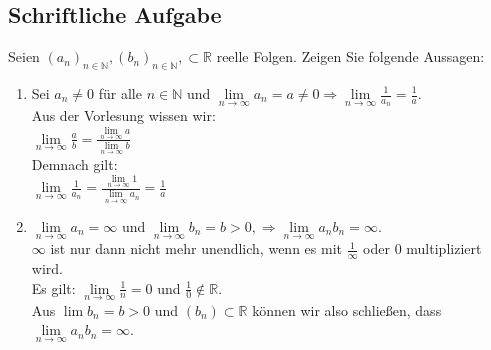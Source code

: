 \documentclass[a4paper]{article}
\begin{document}
\subsection{Schriftliche Aufgabe}
Seien $(a_n)_{n\in\mathbb{N}}, (b_n)_{n\in\mathbb{N}}, \subset \mathbb{R}$ reelle Folgen. Zeigen Sie folgende Aussagen:
\begin{enumerate}[label=(\alph*)]
    \item Sei $a_n\neq 0$ für alle $n \in \mathbb{N}$ und $\lim\limits_{n\to\infty}a_n=a \neq 0 \Rightarrow \lim\limits_{n\to\infty} \frac{1}{a_n}=\frac{1}{a}$.\\
    Aus der Vorlesung wissen wir:\\
    $\lim\limits_{n \to \infty} \frac{a}{b} = \frac{\lim\limits_{n \to \infty} a}{\lim\limits_{n \to \infty} b}$\\
    Demnach gilt:\\
    $\lim\limits_{n \to \infty} \frac{1}{a_n} = \frac{\lim\limits_{n \to \infty} 1}{\lim\limits_{n \to \infty} a_n} = \frac{1}{a}$
    \bigskip
    \item $\lim\limits_{n\to\infty}a_n=\infty$ und $\lim\limits_{n\to\infty}b_n=b>0, \Rightarrow \lim\limits_{n\to\infty}a_nb_n=\infty$.\\
    $\infty$ ist nur dann nicht mehr unendlich, wenn es mit $\frac{1}{\infty}$ oder 0 multipliziert wird.\\
    Es gilt: $\lim\limits_{n\to\infty}\frac{1}{n}=0$ und $\frac{1}{0} \notin \mathbb{R}$.\\
    Aus $\lim\limits b_n=b>0$ und $(b_n) \subset \mathbb{R}$ können wir also schließen, dass $\lim\limits_{n\to\infty}a_n b_n=\infty$.
\end{enumerate}
\end{document}
